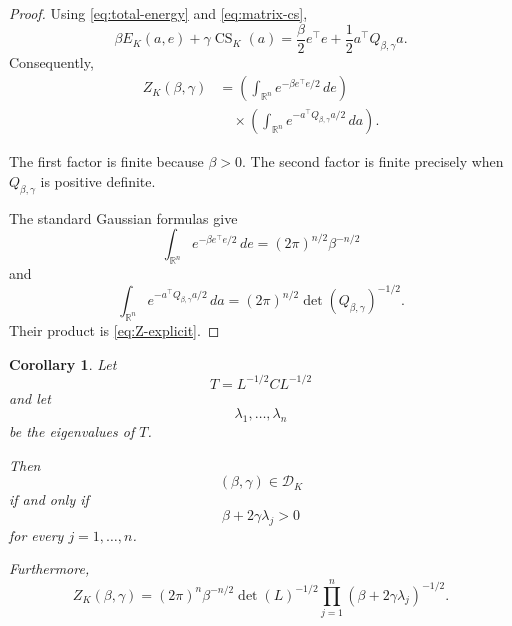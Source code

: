 \documentclass[11pt]{article}
\newtheorem{corollary}[theorem]{Corollary}
\theoremstyle{definition}
\theoremstyle{remark}
\newcommand{\R}{\mathbb{R}}
\newcommand{\CS}{\operatorname{CS}}
\begin{document}
\begin{proof}
Using \eqref{eq:total-energy} and \eqref{eq:matrix-cs},
\begin{equation}
\beta E_K(a,e)+\gamma\CS_K(a)
=
\frac{\beta}{2}e^\top e
+
\frac12a^\top Q_{\beta,\gamma}a.
\end{equation}
Consequently,
\begin{align}
Z_K(\beta,\gamma)
&=
\left(
\int_{\R^n}
e^{-\beta e^\top e/2}\,de
\right)
\nonumber\\
&\quad\times
\left(
\int_{\R^n}
e^{-a^\top Q_{\beta,\gamma}a/2}\,da
\right).
\end{align}

The first factor is finite because \(\beta>0\).
The second factor is finite precisely when
\(Q_{\beta,\gamma}\) is positive definite.

The standard Gaussian formulas give
\begin{equation}
\int_{\R^n}
e^{-\beta e^\top e/2}\,de
=
(2\pi)^{n/2}\beta^{-n/2}
\end{equation}
and
\begin{equation}
\int_{\R^n}
e^{-a^\top Q_{\beta,\gamma}a/2}\,da
=
(2\pi)^{n/2}
\det(Q_{\beta,\gamma})^{-1/2}.
\end{equation}
Their product is \eqref{eq:Z-explicit}.
\end{proof}

\begin{corollary}
\label{cor:spectral}
Let
\begin{equation}
T=L^{-1/2}CL^{-1/2}
\label{eq:T}
\end{equation}
and let
\begin{equation}
\lambda_1,\dots,\lambda_n
\end{equation}
be the eigenvalues of \(T\).

Then
\begin{equation}
(\beta,\gamma)\in\mathscr D_K
\end{equation}
if and only if
\begin{equation}
\beta+2\gamma\lambda_j>0
\label{eq:eigenvalue-condition}
\end{equation}
for every \(j=1,\dots,n\).

Furthermore,
\begin{equation}
Z_K(\beta,\gamma)
=
(2\pi)^n
\beta^{-n/2}
\det(L)^{-1/2}
\prod_{j=1}^n
(\beta+2\gamma\lambda_j)^{-1/2}.
\label{eq:Z-eigenvalues}
\end{equation}
\end{corollary}
\end{document}
